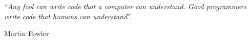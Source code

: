 \begin{epigrafe}
	
	\vspace*{\fill}
    
	\epigraph{``\emph{Any fool can write code that a computer can understand. Good programmers write code that humans can understand}''.}{Martin Fowler}
	
\end{epigrafe}